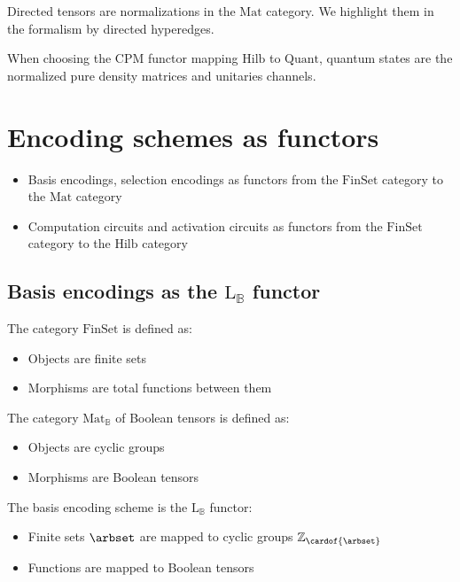 \documentclass[aps,onecolumn,nofootinbib,pra]{article}
\begin{document}
    Directed tensors are normalizations in the $\mathrm{Mat}$ category.
    We highlight them in the \tnreason{} formalism by directed hyperedges.

    When choosing the $\mathrm{CPM}$ functor mapping $\mathrm{Hilb}$ to $\mathrm{Quant}$, quantum states are the normalized pure density matrices and unitaries channels.


    \section{Encoding schemes as functors}

    \begin{itemize}
        \item Basis encodings, selection encodings as functors from the $\mathrm{FinSet}$ category to the $\mathrm{Mat}$ category
        \item Computation circuits and activation circuits as functors from the $\mathrm{FinSet}$ category to the $\mathrm{Hilb}$ category
    \end{itemize}

    \subsection{Basis encodings as the $\mathrm{L}_{\mathbb{B}}$ functor}

    The category $\mathrm{FinSet}$ is defined as:
    \begin{itemize}
        \item Objects are finite sets
        \item Morphisms are total functions between them
    \end{itemize}

    The category $\mathrm{Mat}_{\mathbb{B}}$ of Boolean tensors is defined as:
    \begin{itemize}
        \item Objects are cyclic groups
        \item Morphisms are Boolean tensors
    \end{itemize}

    The basis encoding scheme is the $\mathrm{L}_{\mathbb{B}}$ functor:
    \begin{itemize}
        \item Finite sets $\arbset$ are mapped to cyclic groups $\cyclicgroupof{\cardof{\arbset}}$
        \item Functions are mapped to Boolean tensors
    \end{itemize}
\end{document}
